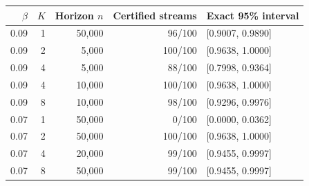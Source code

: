 \begin{tabular}{rrrrl}\toprule $\beta$ & $K$ & Horizon $n$ & Certified streams & Exact 95\% interval\\\midrule
0.09 & 1 & 50,000 & 96/100 & [0.9007, 0.9890]\\
0.09 & 2 & 5,000 & 100/100 & [0.9638, 1.0000]\\
0.09 & 4 & 5,000 & 88/100 & [0.7998, 0.9364]\\
0.09 & 4 & 10,000 & 100/100 & [0.9638, 1.0000]\\
0.09 & 8 & 10,000 & 98/100 & [0.9296, 0.9976]\\
0.07 & 1 & 50,000 & 0/100 & [0.0000, 0.0362]\\
0.07 & 2 & 50,000 & 100/100 & [0.9638, 1.0000]\\
0.07 & 4 & 20,000 & 99/100 & [0.9455, 0.9997]\\
0.07 & 8 & 50,000 & 99/100 & [0.9455, 0.9997]\\\bottomrule\end{tabular}

